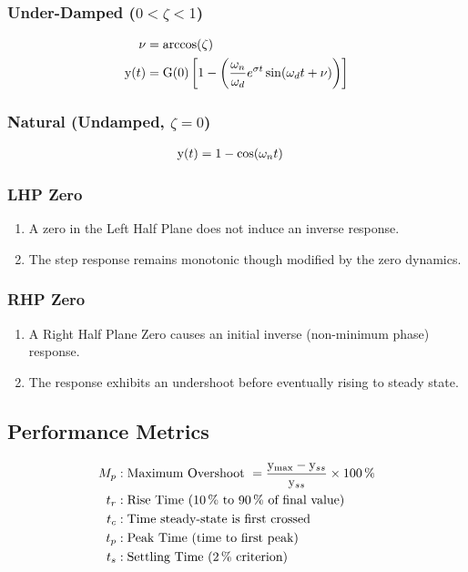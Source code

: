 \documentclass[8pt]{extarticle}
\begin{document}
\begin{multicols*}{3}
\subsubsection*{Under-Damped (\(0 < \zeta < 1\))}
\begin{align*}
    \nu &= \arccos{\zeta} \\
    \func{y}[t] &= \func{G}[0]\left[ 1 - \left( \frac{\omega_n}{\omega_d} e^{\sigma t} \sin{\omega_d t + \nu} \right) \right] \\
\end{align*}

\subsubsection*{Natural (Undamped, \(\zeta = 0\))}
\begin{align*}
    \func{y}[t] &= 1 - \cos{\omega_n t}
\end{align*}

\subsubsection*{LHP Zero}
\begin{enumerate}
    \item A zero in the Left Half Plane does not induce an inverse response.
    \item The step response remains monotonic though modified by the zero dynamics.
\end{enumerate}

\subsubsection*{RHP Zero}
\begin{enumerate}
    \item A Right Half Plane Zero causes an initial inverse (non-minimum phase) response.
    \item The response exhibits an undershoot before eventually rising to steady state.
\end{enumerate}

\subsection*{Performance Metrics}
\begin{align*}
    M_p &: \text{Maximum Overshoot } = \frac{\func{y}_{\max}-\func{y}_{ss}}{\func{y}_{ss}} \times \qty{100}{\percent} \\
    t_r &: \text{Rise Time (\qty{10}{\percent} to \qty{90}{\percent} of final value)} \\
    t_c &: \text{Time steady-state is first crossed} \\
    t_p &: \text{Peak Time (time to first peak)} \\
    t_s &: \text{Settling Time (\qty{2}{\percent} criterion)}
\end{align*}


\end{multicols*}
\end{document}
